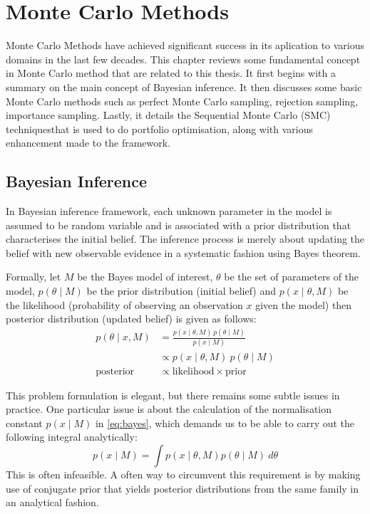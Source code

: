 \chapter{Monte Carlo Methods}
\graphicspath{{Chapter2/figures/}}
\label{ch:mcmethods}
Monte Carlo Methods have achieved significant success in its aplication to various domains in the last few decades. This chapter reviews some fundamental concept in Monte Carlo method that are related to this thesis. It first begins with a summary on the main concept of Bayesian inference. It then discusses some  basic Monte Carlo methods such as perfect Monte Carlo sampling, rejection sampling, importance sampling. Lastly, it details the Sequential Monte Carlo (SMC) techniquesthat is used to do portfolio optimisation, along with various enhancement made to the framework.

\section{Bayesian Inference}
In Bayesian inference framework, each unknown parameter in the model is assumed to be random variable and is associated with a prior distribution that characterises the initial belief. The inference process is merely about updating the belief with new observable evidence in a systematic fashion using Bayes theorem.

Formally, let $M$ be the Bayes model of interest, $\theta$ be the set of parameters of the model, $p\left(\theta \mid M\right)$ be the prior distribution (initial belief) and $p(x \mid \theta, M)$ be the likelihood (probability of observing an observation $x$ given the model) then posterior distribution (updated belief) is given as follows:  
\begin{align}
  p(\theta \mid x , M) &= \frac{p(x \mid \theta , M)~p(\theta \mid M)}{p(x \mid M)} \nonumber \\
                   &\propto p(x \mid \theta , M)~p(\theta \mid M) \label{eq:bayes} \\
  \text{posterior} &\propto \text{likelihood} \times \text{prior}
\end{align}

This problem formulation is elegant, but there remains some subtle issues in practice. One particular issue is about the calculation of the normalisation constant $p(x \mid M)$ in \eqref{eq:bayes}, which demands us to be able to carry out the following integral  analytically:
\begin{equation}
  p(x \mid M) = \int p(x \mid \theta, M) p(\theta \mid M)~d\theta
\end{equation}
This is often infeasible. A often way to circumvent this requirement is by making use of conjugate prior that yields posterior distributions from the same family in an analytical fashion.

